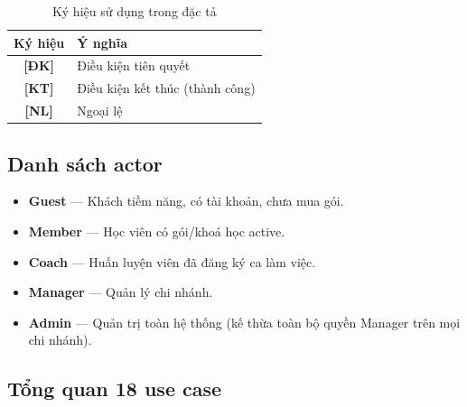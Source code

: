 \begin{table}[h]
\centering
\begin{tabular}{|c|l|}
\hline
\textbf{Ký hiệu} & \textbf{Ý nghĩa} \\ \hline
\textbf{[ĐK]} & Điều kiện tiên quyết \\ \hline
\textbf{[KT]} & Điều kiện kết thúc (thành công) \\ \hline
\textbf{[NL]} & Ngoại lệ \\ \hline
\end{tabular}
\caption{Ký hiệu sử dụng trong đặc tả}
\end{table}

\subsection*{Danh sách actor}
\begin{itemize}
    \item \textbf{Guest} — Khách tiềm năng, có tài khoản, chưa mua gói.
    \item \textbf{Member} — Học viên có gói/khoá học active.
    \item \textbf{Coach} — Huấn luyện viên đã đăng ký ca làm việc.
    \item \textbf{Manager} — Quản lý chi nhánh.
    \item \textbf{Admin} — Quản trị toàn hệ thống (kế thừa toàn bộ quyền Manager trên mọi chi nhánh).
\end{itemize}

\subsection*{Tổng quan 18 use case}

